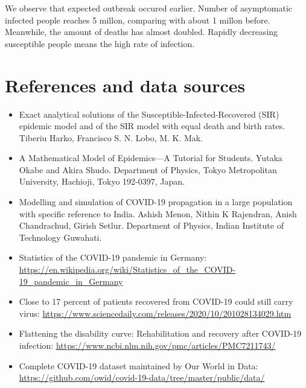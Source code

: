 \documentclass[12pt, a4paper]{article}
\begin{document}
	We observe that expected outbreak occured earlier. Number of asymptomatic infected people reaches 5 millon, comparing with about 1 millon before. Meanwhile, the amount of deaths has almost doubled. Rapidly decreasing susceptible people means the high rate of infection.

	\newpage

	\section{References and data sources}
	\begin{itemize}
		\item Exact analytical solutions of the Susceptible-Infected-Recovered (SIR) epidemic
		model and of the SIR model with equal death and birth rates. Tiberiu Harko, Francisco S. N. Lobo, M. K. Mak.

		\item A Mathematical Model of Epidemics—A Tutorial
		for Students. Yutaka Okabe and Akira Shudo. Department of Physics, Tokyo Metropolitan University, Hachioji, Tokyo 192-0397, Japan.

		\item Modelling and simulation of COVID-19 propagation in a large population with specific reference to India.
		Ashish Menon, Nithin K Rajendran, Anish Chandrachud, Girish Setlur. Department of Physics, Indian Institute of Technology Guwahati.

		\item Statistics of the COVID-19 pandemic in Germany: \url{https://en.wikipedia.org/wiki/Statistics_of_the_COVID-19_pandemic_in_Germany}
	
		\item Close to 17 percent of patients recovered from COVID-19 could still carry virus: \url{https://www.sciencedaily.com/releases/2020/10/201028134029.htm}
		
		\item Flattening the disability curve: Rehabilitation and recovery after COVID-19 infection: \url{https://www.ncbi.nlm.nih.gov/pmc/articles/PMC7211743/}
		
		\item Complete COVID-19 dataset maintained by Our World in Data: \url{https://github.com/owid/covid-19-data/tree/master/public/data/}
		
		
	\end{itemize}

	
\end{document}
